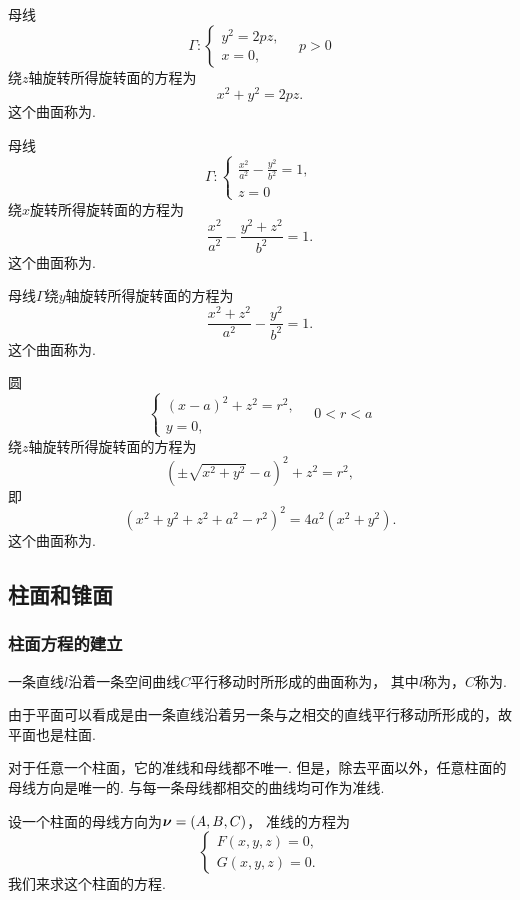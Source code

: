 \begin{example}
母线\[
	\Gamma: \left\{ \begin{array}{l}
		y^2 = 2pz, \\
		x = 0,
	\end{array} \right.
	\quad p>0
\]
绕\(z\)轴旋转所得旋转面的方程为\[
	x^2+y^2=2pz.
\]
这个曲面称为.
\end{example}

\begin{example}
母线\[
	\Gamma: \left\{ \begin{array}{l}
		\frac{x^2}{a^2}-\frac{y^2}{b^2}=1, \\
		z=0
	\end{array} \right.
\]
绕\(x\)旋转所得旋转面的方程为\[
	\frac{x^2}{a^2}-\frac{y^2+z^2}{b^2}=1.
\]
这个曲面称为.

母线\(\Gamma\)绕\(y\)轴旋转所得旋转面的方程为\[
	\frac{x^2+z^2}{a^2}-\frac{y^2}{b^2}=1.
\]
这个曲面称为.
\end{example}

\begin{example}
圆\[
	\left\{ \begin{array}{l}
		(x-a)^2+z^2=r^2, \\
		y=0,
	\end{array} \right.
	\quad 0<r<a
\]
绕\(z\)轴旋转所得旋转面的方程为\[
	(\pm\sqrt{x^2+y^2}-a)^2+z^2=r^2,
\]
即\[
	(x^2+y^2+z^2+a^2-r^2)^2=4a^2(x^2+y^2).
\]
这个曲面称为.
\end{example}

\subsection{柱面和锥面}
\subsubsection{柱面方程的建立}
一条直线\(l\)沿着一条空间曲线\(C\)平行移动时所形成的曲面称为，
其中\(l\)称为，\(C\)称为.

由于平面可以看成是由一条直线沿着另一条与之相交的直线平行移动所形成的，故平面也是柱面.

对于任意一个柱面，它的准线和母线都不唯一.
但是，除去平面以外，任意柱面的母线方向是唯一的.
与每一条母线都相交的曲线均可作为准线.

设一个柱面的母线方向为\(\boldsymbol{\nu}=(A,B,C)\)，
准线的方程为\[
	\left\{ \begin{array}{l}
		F(x,y,z) = 0, \\
		G(x,y,z) = 0.
	\end{array} \right.
\]
我们来求这个柱面的方程.

